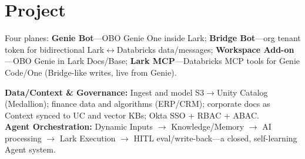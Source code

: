 \documentclass[letterpaper]{deedy-resume}
\begin{document}
\begin{minipage}[t]{0.66\textwidth}





\section{Project}
\vspace{1mm}

\runsubsection{}
Four planes: \textbf{Genie Bot}---OBO Genie One inside Lark; \textbf{Bridge Bot}---org tenant token for bidirectional Lark$\leftrightarrow$Databricks data/messages; \textbf{Workspace Add-on}---OBO Genie in Lark Docs/Base; \textbf{Lark MCP}---Databricks MCP tools for Genie Code/One (Bridge-like writes, live from Genie).

\sectionspace

\runsubsection{}
\textbf{Data/Context \& Governance:} Ingest and model S3$\to$Unity Catalog (Medallion); finance data and algorithms (ERP/CRM); corporate docs as Context synced to UC and vector KBs; Okta SSO + RBAC + ABAC. \\
\textbf{Agent Orchestration:} Dynamic Inputs $\to$ Knowledge/Memory $\to$ AI processing $\to$ Lark Execution $\to$ HITL eval/write-back---a closed, self-learning Agent system.

\sectionspace


\end{minipage}
\end{document}
